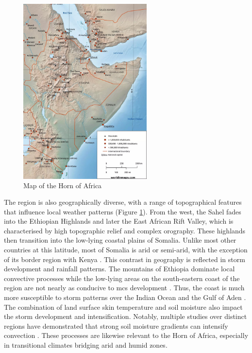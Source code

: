 \begin{figure}[ht]
    \centering
    \includegraphics[width=0.6\textwidth]{../figures/static/horn-of-africa-map-scaled.jpeg}
    \caption{Map of the Horn of Africa \citep{WorldInMaps2024}}
    \label{fig:horn-of-africa}
\end{figure}

The region is also geographically diverse, with a range of topographical features that influence local weather patterns (Figure \ref{fig:horn-of-africa}). From the west, the Sahel fades into the Ethiopian Highlands and later the East African Rift Valley, which is characterised by high topographic relief and complex orography. These highlands then transition into the low-lying coastal plains of Somalia. Unlike most other countries at this latitude, most of Somalia is arid or semi-arid, with the exception of its border region with Kenya \citep{Beck2023}. This contrast in geography is reflected in storm development and rainfall patterns. The mountains of Ethiopia dominate local convective processes while the low-lying areas on the south-eastern coast of the region are not nearly as conducive to \acrshort{mcs} development \citep{Negash2024,Camberlin2024}. Thus, the coast is much more susceptible to storm patterns over the Indian Ocean and the Gulf of Aden \citep{Camberlin2024}. The combination of land surface skin temperature and soil moisture also impact the storm development and intensification. Notably, multiple studies over distinct regions have demonstrated that strong soil moisture gradients can intensify convection \citep{Barton2021,Klein2020,Taylor2017}. These processes are likewise relevant to the Horn of Africa, especially in transitional climates bridging arid and humid zones.

